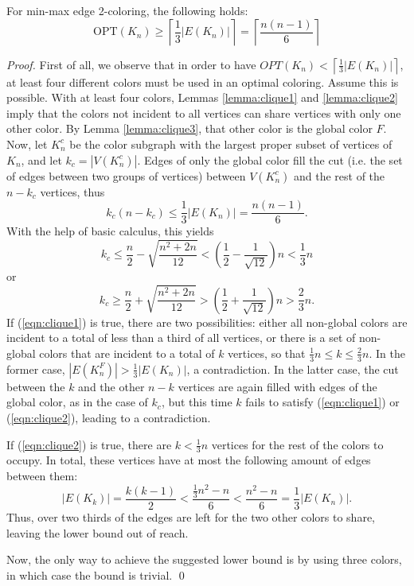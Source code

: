 \documentclass[runningheads, a4paper]{llncs}
\begin{document}
\begin{theorem}\label{theorem:clique}
For min-max edge 2-coloring, the following holds:
\begin{equation}\label{eqn:clique-lb}
\textrm{OPT}(K_n) \geq \left\lceil \frac{1}{3} |E(K_n)| \right\rceil = \left\lceil \frac{n(n-1)}{6} \right\rceil
\end{equation}
\end{theorem}
\begin{proof}
First of all, we observe that in order to have $OPT(K_n) < \left\lceil \frac{1}{3} |E(K_n)| \right\rceil$, at least four different colors must be used in an optimal coloring. Assume this is possible. With at least four colors, Lemmas \ref{lemma:clique1} and \ref{lemma:clique2} imply that the colors not incident to all vertices can share vertices with only one other color. By Lemma \ref{lemma:clique3}, that other color is the global color $F$. Now, let $K_n^{c}$ be the color subgraph with the largest proper subset of vertices of $K_n$, and let $k_{c} = |V(K_n^{c})|$. Edges of only the global color fill the cut (i.e. the set of edges between two groups of vertices) between $V(K_n^{c})$ and the rest of the $n-k_{c}$ vertices, thus
\begin{displaymath}
k_{c}(n-k_{c}) \leq \frac{1}{3} |E(K_n)| = \frac{n(n-1)}{6}.
\end{displaymath}
With the help of basic calculus, this yields
\begin{equation}\label{eqn:clique1}
k_{c} \leq \frac{n}{2} - \sqrt{\frac{n^2 + 2n}{12}} < \left(\frac{1}{2} - \frac{1}{\sqrt{12}}\right)n < \frac{1}{3}n
\end{equation}
or
\begin{equation}\label{eqn:clique2}
k_{c} \geq \frac{n}{2} + \sqrt{\frac{n^2 + 2n}{12}} > \left(\frac{1}{2} + \frac{1}{\sqrt{12}}\right)n > \frac{2}{3}n.
\end{equation}
If (\ref{eqn:clique1}) is true, there are two possibilities: either all non-global colors are incident to a total of less than a third of all vertices, or there is a set of non-global colors that are incident to a total of $k$ vertices, so that $\frac{1}{3}n \leq k \leq \frac{2}{3}n$. In the former case, $|E(K_n^F)| > \frac{1}{3} |E(K_n)|$, a contradiction. In the latter case, the cut between the $k$ and the other $n-k$ vertices are again filled with edges of the global color, as in the case of $k_{c}$, but this time $k$ fails to satisfy (\ref{eqn:clique1}) or (\ref{eqn:clique2}), leading to a contradiction.

If (\ref{eqn:clique2}) is true, there are $k < \frac{1}{3}n$ vertices for the rest of the colors to occupy. In total, these vertices have at most the following amount of edges between them:
\begin{displaymath}
|E(K_k)| = \frac{k(k-1)}{2} < \frac{\frac{1}{3}n^2 - n}{6} < \frac{n^2-n}{6} = \frac{1}{3}|E(K_n)|.
\end{displaymath}
Thus, over two thirds of the edges are left for the two other colors to share, leaving the lower bound out of reach.

Now, the only way to achieve the suggested lower bound is by using three colors, in which case the bound is trivial. \qed
\end{proof}
\end{document}
